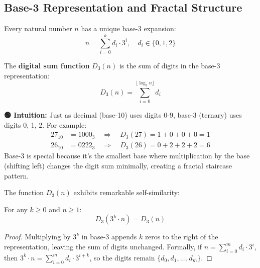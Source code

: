 \subsection{Base-3 Representation and Fractal Structure}

Every natural number $n$ has a unique base-3 expansion:
\begin{equation}
n = \sum_{i=0}^{k} d_i \cdot 3^i, \quad d_i \in \{0, 1, 2\}
\end{equation}

\begin{definition}
\label{def:digital_sum}
The \textbf{digital sum function} $D_3(n)$ is the sum of digits in the base-3 representation:
\begin{equation}
D_3(n) = \sum_{i=0}^{\lfloor \log_3 n \rfloor} d_i
\end{equation}
\end{definition}

\begin{greenbox}
\textbf{🟢 Intuition:} Just as decimal (base-10) uses digits 0-9, base-3 (ternary) uses digits 0, 1, 2. For example:
\begin{align*}
27_{10} &= 1000_3 \quad \Rightarrow \quad D_3(27) = 1 + 0 + 0 + 0 = 1 \\
26_{10} &= 0222_3 \quad \Rightarrow \quad D_3(26) = 0 + 2 + 2 + 2 = 6
\end{align*}
Base-3 is special because it's the smallest base where multiplication by the base (shifting left) changes the digit sum minimally, creating a fractal staircase pattern.
\end{greenbox}

The function $D_3(n)$ exhibits remarkable self-similarity:

\begin{lemma}
\label{lem:d3_scaling}
For any $k \geq 0$ and $n \geq 1$:
\begin{equation}
D_3(3^k \cdot n) = D_3(n)
\end{equation}
\end{lemma}

\begin{proof}
Multiplying by $3^k$ in base-3 appends $k$ zeros to the right of the representation, leaving the sum of digits unchanged. Formally, if $n = \sum_{i=0}^{m} d_i \cdot 3^i$, then $3^k \cdot n = \sum_{i=0}^{m} d_i \cdot 3^{i+k}$, so the digits remain $\{d_0, d_1, \ldots, d_m\}$.
\end{proof}

